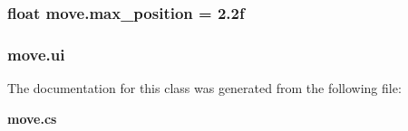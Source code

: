 \subsubsection[{max\+\_\+position}]{\setlength{\rightskip}{0pt plus 5cm}float move.\+max\+\_\+position = 2.\+2f}\label{classmove_a2f080b1798d1248838a8a4d044e372c1}
\subsubsection[{ui}]{ move.\+ui}\label{classmove_a5e2063f95c2a433b465265108a309e64}


The documentation for this class was generated from the following file\+:\begin{DoxyCompactItemize}
\item 
{\bf move.\+cs}\end{DoxyCompactItemize}
